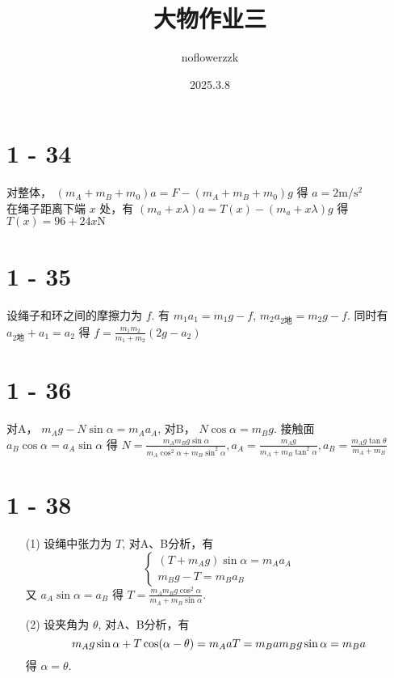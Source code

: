 \documentclass{article}
\title{大物作业三}
\author{noflowerzzk}
\date{2025.3.8}
\newcommand{\mptt}{\mathrm{m/s^2}}
\newcommand{\N}{\mathrm{N}}
\begin{document}
\maketitle

\section*{1 - 34}

对整体， $(m_A + m_B + m_0)a = F - (m_A + m_B + m_0)g$ 得 $a = 2 \mptt$ \\

在绳子距离下端 $x$ 处，有 $(m_a + x\lambda)a = T(x) - (m_a + x\lambda)g$ 得 $T(x) = 96 + 24 x \N$

\section*{1 - 35}

设绳子和环之间的摩擦力为 $f$. 有 $m_1 a_1 = m_1g - f$, $m_2a_{2\text{地}} = m_2g - f$. 同时有 $a_{2\text{地}} + a_1 = a_2$ 得 $f = \frac{m_1m_2}{m_1 + m_2}(2g - a_2)$

\section*{1 - 36}

对A， $m_Ag - N\sin \alpha = m_Aa_A$, 对B， $N\cos \alpha = m_Bg$. 接触面 $a_B\cos \alpha = a_A \sin \alpha$ 得 $N = \frac{m_Am_Bg\sin \alpha}{m_A\cos^2 \alpha + m_B \sin^2 \alpha}, a_A = \frac{m_A g}{m_A + m_B \tan^2 \alpha}, a_B = \frac{m_Ag\tan \theta}{m_A + m_B}$

\section*{1 - 38}

\begin{itemize}
    \item [(1)] 设绳中张力为 $T$, 对A、B分析，有 
    \[
        \begin{cases}
            (T + m_Ag)\sin \alpha = m_Aa_A \\
            m_Bg - T = m_Ba_B
        \end{cases}
    \]
    又 $a_A\sin \alpha = a_B$ 得 $T = \frac{m_Am_Bg\cos^2 \alpha}{m_A + m_B\sin \alpha}$.
    \item [(2)] 设夹角为 $\theta$, 对A、B分析，有
    \[
        m_Ag\sin \alpha + T\cos (\alpha - \theta) = m_Aa \\
        T = m_Ba \\
        m_Bg \sin\alpha = m_Ba
    \]
    得 $\alpha = \theta$.
\end{itemize}
\end{document}
